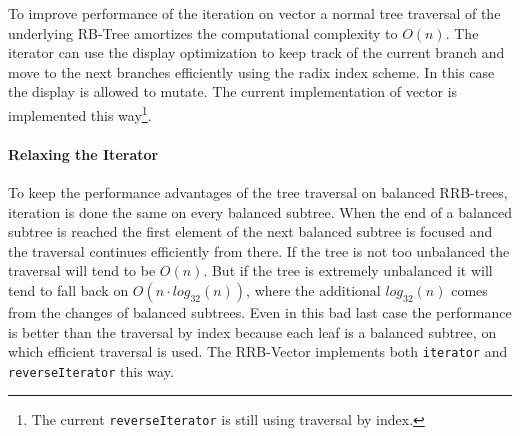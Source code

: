 To improve performance of the iteration on vector a normal tree traversal of the underlying RB-Tree amortizes the computational complexity to $O(n)$. The iterator can use the display optimization to keep track of the current branch and move to the next branches efficiently using the radix index scheme. In this case the display is allowed to mutate. The current implementation of vector is implemented this way\footnote{The current \texttt{reverseIterator} is still using traversal by index.}. 

\paragraph{Relaxing the Iterator}
To keep the performance advantages of the tree traversal on balanced RRB-trees, iteration is done the same on every balanced subtree. When the end of a balanced subtree is reached the first element of the next balanced subtree is focused and the traversal continues efficiently from there. If the tree is not too unbalanced the traversal will tend to be $O(n)$. But if the tree is extremely unbalanced it will tend to fall back on $O(n \cdot log_{32}(n))$, where the additional $log_{32}(n)$ comes from the changes of balanced subtrees. Even in this bad last case the performance is better than the traversal by index because each leaf is a balanced subtree, on which efficient traversal is used. The RRB-Vector implements both \texttt{iterator} and \texttt{reverseIterator} this way.






